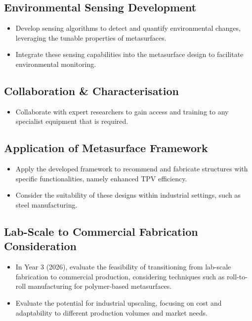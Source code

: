 \subsection{Environmental Sensing Development}
\begin{itemize}
    \item Develop sensing algorithms to detect and quantify environmental changes, leveraging the tunable properties of metasurfaces.
    \item Integrate these sensing capabilities into the metasurface design to facilitate environmental monitoring.
\end{itemize}

\subsection{Collaboration \& Characterisation}
\begin{itemize}
    \item Collaborate with expert researchers to gain access and training to any specialist equipment that is required.
\end{itemize}

\subsection{Application of Metasurface Framework}
\begin{itemize}
    \item Apply the developed framework to recommend and fabricate structures with specific functionalities, namely enhanced TPV efficiency.
    \item Consider the suitability of these designs within industrial settings, such as steel manufacturing.
\end{itemize}

\subsection{Lab-Scale to Commercial Fabrication Consideration}
\begin{itemize}
    \item In Year 3 (2026), evaluate the feasibility of transitioning from lab-scale fabrication to commercial production, considering techniques such as roll-to-roll manufacturing for polymer-based metasurfaces.
    \item Evaluate the potential for industrial upscaling, focusing on cost and adaptability to different production volumes and market needs.
\end{itemize}



